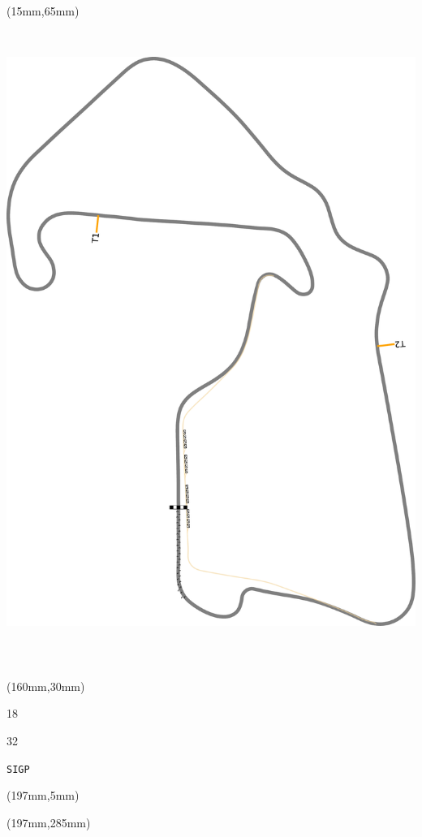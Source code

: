 \begin{textblock*}{185mm}(15mm,65mm)%
\centering
\mbox{\includegraphics[width=185mm,height=210mm,keepaspectratio]{PT/SIGP.pdf}}
\end{textblock*}
\begin{textblock*}{40mm}(160mm,30mm)%
\Large
\par{} 
\par18 
\par32 
\par\hfill\tiny\tt SIGP\\
\end{textblock*}
\begin{textblock*}{20mm}(197mm,5mm)%
\fbox{\thepage}
\label{SIGP}
\end{textblock*}
\begin{textblock*}{20mm}(197mm,285mm)%
\fbox{\thepage}
\end{textblock*}


